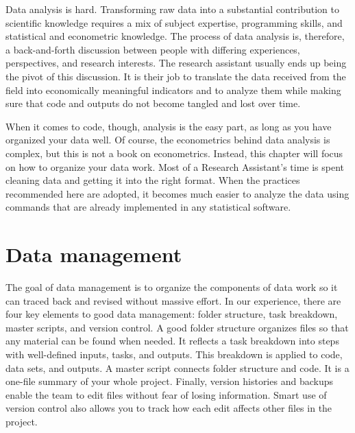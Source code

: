 
\begin{fullwidth}
Data analysis is hard. 
Transforming raw data into a substantial contribution to scientific knowledge 
requires a mix of subject expertise, programming skills, 
and statistical and econometric knowledge. 
The process of data analysis is, therefore, 
a back-and-forth discussion between people 
with differing experiences, perspectives, and research interests. 
The research assistant usually ends up being the pivot of this discussion. 
It is their job to translate the data received from the field into
economically meaningful indicators and to analyze them 
while making sure that code and outputs do not become tangled and lost over time.

When it comes to code, though, analysis is the easy part, 
as long as you have organized your data well. 
Of course, the econometrics behind data analysis is complex, 
but this is not a book on econometrics. 
Instead, this chapter will focus on how to organize your data work.
Most of a Research Assistant's time is spent cleaning data and getting it into the right format. 
When the practices recommended here are adopted,
it becomes much easier to analyze the data 
using commands that are already implemented in any statistical software. 


\end{fullwidth}


\section{Data management}
The goal of data management is to organize the components of data work 
so it can traced back and revised without massive effort.
In our experience, there are four key elements to good data management: 
folder structure, task breakdown, master scripts, and version control. 
A good folder structure organizes files so that any material can be found when needed.
It reflects a task breakdown into steps with well-defined inputs, tasks, and outputs.
This breakdown is applied to code, data sets, and outputs.
A master script connects folder structure and code.
It is a one-file summary of your whole project.
Finally, version histories and backups enable the team 
to edit files without fear of losing information.
Smart use of version control also allows you to track 
how each edit affects other files in the project.

